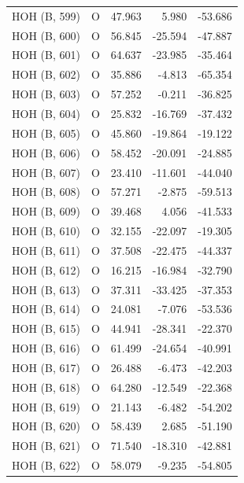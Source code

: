 \begin{longtable}{@{}lcrr@{}}
  \cmidrule(r){1-5}
  HOH (B, 599) & O & 47.963 & 5.980 & -53.686 \\
  \cmidrule(r){1-5}
  HOH (B, 600) & O & 56.845 & -25.594 & -47.887 \\
  \cmidrule(r){1-5}
  HOH (B, 601) & O & 64.637 & -23.985 & -35.464 \\
  \cmidrule(r){1-5}
  HOH (B, 602) & O & 35.886 & -4.813 & -65.354 \\
  \cmidrule(r){1-5}
  HOH (B, 603) & O & 57.252 & -0.211 & -36.825 \\
  \cmidrule(r){1-5}
  HOH (B, 604) & O & 25.832 & -16.769 & -37.432 \\
  \cmidrule(r){1-5}
  HOH (B, 605) & O & 45.860 & -19.864 & -19.122 \\
  \cmidrule(r){1-5}
  HOH (B, 606) & O & 58.452 & -20.091 & -24.885 \\
  \cmidrule(r){1-5}
  HOH (B, 607) & O & 23.410 & -11.601 & -44.040 \\
  \cmidrule(r){1-5}
  HOH (B, 608) & O & 57.271 & -2.875 & -59.513 \\
  \cmidrule(r){1-5}
  HOH (B, 609) & O & 39.468 & 4.056 & -41.533 \\
  \cmidrule(r){1-5}
  HOH (B, 610) & O & 32.155 & -22.097 & -19.305 \\
  \cmidrule(r){1-5}
  HOH (B, 611) & O & 37.508 & -22.475 & -44.337 \\
  \cmidrule(r){1-5}
  HOH (B, 612) & O & 16.215 & -16.984 & -32.790 \\
  \cmidrule(r){1-5}
  HOH (B, 613) & O & 37.311 & -33.425 & -37.353 \\
  \cmidrule(r){1-5}
  HOH (B, 614) & O & 24.081 & -7.076 & -53.536 \\
  \cmidrule(r){1-5}
  HOH (B, 615) & O & 44.941 & -28.341 & -22.370 \\
  \cmidrule(r){1-5}
  HOH (B, 616) & O & 61.499 & -24.654 & -40.991 \\
  \cmidrule(r){1-5}
  HOH (B, 617) & O & 26.488 & -6.473 & -42.203 \\
  \cmidrule(r){1-5}
  HOH (B, 618) & O & 64.280 & -12.549 & -22.368 \\
  \cmidrule(r){1-5}
  HOH (B, 619) & O & 21.143 & -6.482 & -54.202 \\
  \cmidrule(r){1-5}
  HOH (B, 620) & O & 58.439 & 2.685 & -51.190 \\
  \cmidrule(r){1-5}
  HOH (B, 621) & O & 71.540 & -18.310 & -42.881 \\
  \cmidrule(r){1-5}
  HOH (B, 622) & O & 58.079 & -9.235 & -54.805 \\

\end{longtable}
